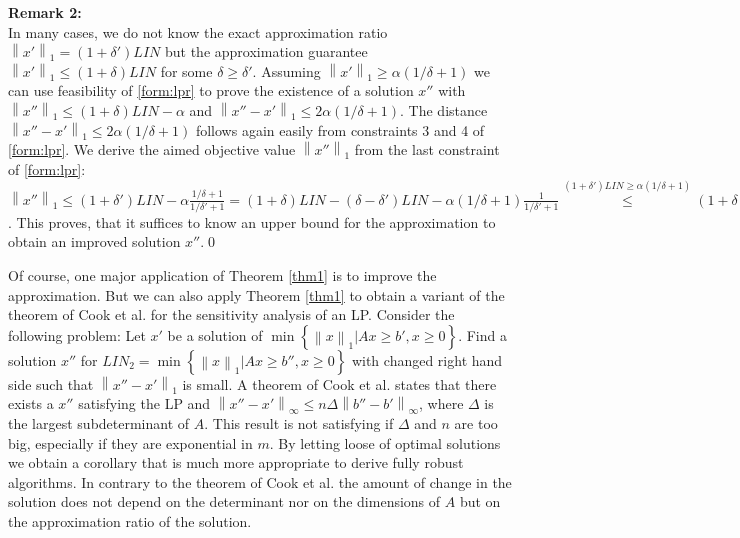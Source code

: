 \documentclass[a4paper,11pt]{article}
\newcommand{\mengest}[2]{\left\{#1|#2\right\}}
\newcommand{\nor}[1]{\left\|#1\right\|}
\begin{document}
{\bf Remark 2:\\}
In many cases, we do not know the exact approximation ratio $\nor{x'}_1 = (1+ \delta') \mathit{LIN}$ but the 
approximation
guarantee $\nor{x'}_1 \leq (1+ \delta) \mathit{LIN}$ for some $\delta \geq \delta'$.
Assuming $\nor{x'}_1 \geq \alpha (1/\delta +1)$ we can use feasibility of \ref{form:lpr} to prove the existence of
a solution $x''$ with $\nor{x''}_1 \leq (1+ \delta) \mathit{LIN} - \alpha$ and $\nor{x''-x'}_1 \leq 2\alpha(1/\delta +1)$.
The distance $\nor{x''-x'}_1 \leq 2\alpha(1/\delta +1)$ follows again easily from constraints 3 and 4 of \ref{form:lpr}.
We derive the aimed objective value $\nor{x''}_1$ from the last constraint of \ref{form:lpr}:
$\nor{x''}_1 \leq (1+ \delta')\mathit{LIN} - 
\alpha \frac{1/\delta+1}{1/\delta'+1} = (1+ \delta)\mathit{LIN} - (\delta - \delta')\mathit{LIN} - 
\alpha(1/\delta+1) \frac{1}{1/\delta'+1} \stackrel{(1+ \delta')\mathit{LIN} \geq  \alpha(1/ \delta +1) }{\leq} 
	(1+ \delta) \mathit{LIN} -
       \alpha(1/\delta +1)\frac{\delta - \delta'}{1+ \delta'} - \alpha(1/\delta+1) \frac{\delta'}{1+\delta'} 
       =(1+ \delta) \mathit{LIN} -  \alpha(1/\delta +1)\frac{\delta}{1+ \delta'}
       = (1+ \delta) \mathit{LIN} -  \alpha \frac{1+ \delta}{1+ \delta'} \stackrel{\delta'\leq \delta}{\leq}
       (1+ \delta) \mathit{LIN} -  \alpha$.
This proves, that it suffices to know an upper bound for the approximation to obtain an improved solution $x''$.\qed


Of course, one major application of Theorem \ref{thm1} is to improve the approximation. 
But we can also apply Theorem \ref{thm1} to obtain a variant of the theorem of
Cook et al. \cite{cook1986sensitivity} for the sensitivity analysis of
an LP. Consider the following problem: Let $x'$ be a solution of $\min
\mengest{ \nor{x}_1}{Ax \geq b', x \geq 0 }$.  Find a solution $x''$ for $\mathit{LIN}_2 = 
\min \mengest{ \nor{x}_1}{Ax \geq b'', x \geq 0 }$ with changed right hand side such that
$\nor{x''-x'}_1$ is small. A theorem of Cook
et al. \cite{cook1986sensitivity} states that there exists a $x''$
satisfying the LP and $\nor{x''-x'}_\infty \leq n \Delta
\nor{b''-b'}_\infty$, where $\Delta$ is the largest subdeterminant of
$A$. This result is not satisfying if $\Delta$ and $n$ are too big,
especially if they are exponential in $m$. By letting loose of optimal solutions we obtain
a corollary that is much more appropriate to derive fully robust algorithms.
In contrary to the theorem of Cook et al. \cite{cook1986sensitivity} the amount of change in the solution does not depend on the determinant 
nor on the dimensions
of $A$ but on the approximation ratio of the solution.
\end{document}
